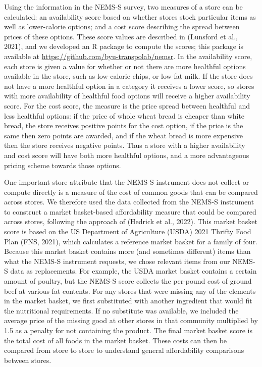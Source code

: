\documentclass[
  letterpaper,
  number,
  review,
  doubleblind,
  3p]{elsarticle}
\begin{document}
Using the information in the NEMS-S survey, two measures of a store can
be calculated: an availability score based on whether stores stock
particular items as well as lower-calorie options; and a cost score
describing the spread between prices of these options. These score
values are described in (Lunsford et al., 2021), and we developed an R
package to compute the scores; this package is available at
\url{https://github.com/byu-transpolab/nemsr}. In the availability
score, each store is given a value for whether or not there are more
healthful options available in the store, such as low-calorie chips, or
low-fat milk. If the store does not have a more healthful option in a
category it receives a lower score, so stores with more availability of
healthful food options will receive a higher availability score. For the
cost score, the measure is the price spread between healthful and less
healthful options: if the price of whole wheat bread is cheaper than
white bread, the store receives positive points for the cost option, if
the price is the same then zero points are awarded, and if the wheat
bread is more expensive then the store receives negative points. Thus a
store with a higher availability and cost score will have both more
healthful options, and a more advantageous pricing scheme towards those
options.

One important store attribute that the NEMS-S instrument does not
collect or compute directly is a measure of the cost of common goods
that can be compared across stores. We therefore used the data collected
from the NEMS-S instrument to construct a market basket-based
affordability measure that could be compared across stores, following
the approach of (Hedrick et al., 2022). This market basket score is
based on the US Department of Agriculture (USDA) 2021 Thrifty Food Plan
(FNS, 2021), which calculates a reference market basket for a family of
four. Because this market basket contains more (and sometimes different)
items than what the NEMS-S instrument requests, we chose relevant items
from our NEMS-S data as replacements. For example, the USDA market
basket contains a certain amount of poultry, but the NEMS-S score
collects the per-pound cost of ground beef at various fat contents. For
any stores that were missing any of the elements in the market basket,
we first substituted with another ingredient that would fit the
nutritional requirements. If no substitute was available, we included
the average price of the missing good at other stores in that community
multiplied by 1.5 as a penalty for not containing the product. The final
market basket score is the total cost of all foods in the market basket.
These costs can then be compared from store to store to understand
general affordability comparisons between stores.
\end{document}
